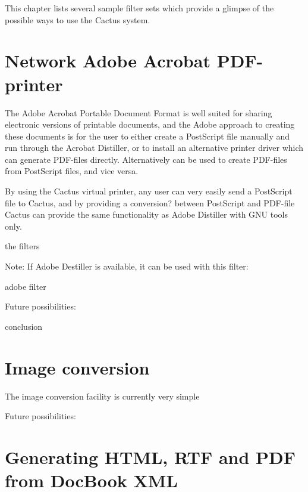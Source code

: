 This chapter lists several sample filter sets which provide a glimpse
of the possible ways to use the Cactus system. 

\section{Network Adobe Acrobat PDF-printer}
\label{sec:network-adobe-acrobat-pdf-printer}

The Adobe Acrobat Portable Document Format is well suited for sharing
electronic versions of printable documents, and the Adobe approach to
creating these documents is for the user to either create a PostScript
file manually and run through the Acrobat Distiller, or to install an
alternative printer driver which can generate PDF-files directly.
Alternatively  can be used to create PDF-files from PostScript files, and
vice versa.

By using the Cactus virtual printer, any user can very easily send a
PostScript file to Cactus, and by providing a \textsf{conversion?}
between PostScript and PDF-file Cactus can provide the same
functionality as Adobe Distiller with GNU tools only.

\textsf{the filters}

Note:  If Adobe Destiller is available, it can be used with this
filter:

\textsf{adobe filter}

Future possibilities:

\textsf{conclusion}
\section{Image conversion}
\label{sec:image-conversion}

The image conversion facility is currently very simple


Future possibilities:


\section{Generating HTML, RTF and PDF from DocBook XML}
\label{sec:xml-publishing}



